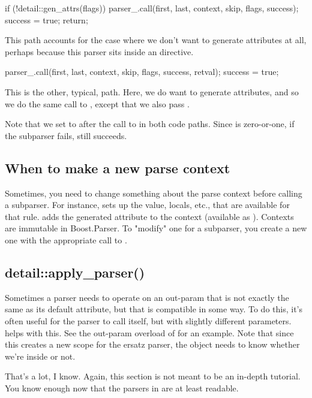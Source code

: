 \documentclass{MyBook}
\begin{document}
\begin{code}
if (!detail::gen_attrs(flags)) {
    parser_.call(first, last, context, skip, flags, success);
    success = true;
    return;
}
\end{code}

This path accounts for the case where we don't want to generate attributes at all, perhaps because this parser sits inside an  directive.

\begin{code}
parser_.call(first, last, context, skip, flags, success, retval);
success = true;
\end{code}

This is the other, typical, path. Here, we do want to generate attributes, and so we do the same call to , except that we also pass .

Note that we set  to  after the call to  in both code paths. Since  is zero-or-one, if the subparser fails,  still succeeds.

\subsection{When to make a new parse context}

Sometimes, you need to change something about the parse context before calling a subparser. For instance,  sets up the value, locals, etc., that are available for that rule.  adds the generated attribute to the context (available as ). Contexts are immutable in Boost.Parser. To "modify" one for a subparser, you create a new one with the appropriate call to .

\subsection{{}{detail::apply\_parser()}}

Sometimes a parser needs to operate on an out-param that is not exactly the same as its default attribute, but that is compatible in some way. To do this, it's often useful for the parser to call itself, but with slightly different parameters.  helps with this. See the out-param overload of  for an example. Note that since this creates a new scope for the ersatz parser, the  object needs to know whether we're inside  or not.

That's a lot, I know. Again, this section is not meant to be an in-depth tutorial. You know enough now that the parsers in  are at least readable.
\end{document}
